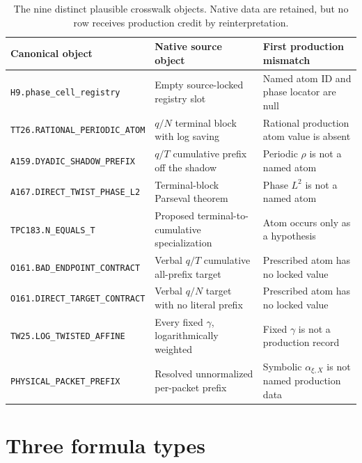 \documentclass[11pt]{article}
\begin{document}
\begin{table}[ht]
\centering
\footnotesize
\begin{tabularx}{\textwidth}{@{}p{}X p{}@{}}
\toprule
Canonical object & Native source object & First production mismatch\\
\midrule
\texttt{H9.phase\_cell\_registry}
 & Empty source-locked registry slot & Named atom ID and phase locator are null\\
\texttt{TT26.RATIONAL\_PERIODIC\_ATOM}
 & \(q/N\) terminal block with log saving & Rational production atom value is absent\\
\texttt{A159.DYADIC\_SHADOW\_PREFIX}
 & \(q/T\) cumulative prefix off the shadow & Periodic \(\rho\) is not a named atom\\
\texttt{A167.DIRECT\_TWIST\_PHASE\_L2}
 & Terminal-block Parseval theorem & Phase \(L^2\) is not a named atom\\
\texttt{TPC183.N\_EQUALS\_T}
 & Proposed terminal-to-cumulative specialization & Atom occurs only as a hypothesis\\
\texttt{O161.BAD\_ENDPOINT\_CONTRACT}
 & Verbal \(q/T\) cumulative all-prefix target & Prescribed atom has no locked value\\
\texttt{O161.DIRECT\_TARGET\_CONTRACT}
 & Verbal \(q/N\) target with no literal prefix & Prescribed atom has no locked value\\
\texttt{TW25.LOG\_TWISTED\_AFFINE}
 & Every fixed \(\gamma\), logarithmically weighted & Fixed \(\gamma\) is not a production record\\
\texttt{PHYSICAL\_PACKET\_PREFIX}
 & Resolved unnormalized per-packet prefix & Symbolic \(\alpha_{\xi,X}\) is not named production data\\
\bottomrule
\end{tabularx}
\caption{The nine distinct plausible crosswalk objects.  Native data are
retained, but no row receives production credit by reinterpretation.}
\label{tab:candidates}
\end{table}

\section{Three formula types}
\end{document}
